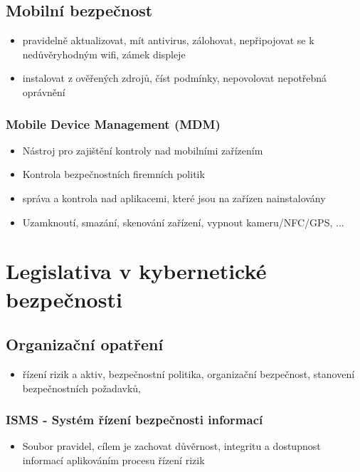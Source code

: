 \documentclass[10pt,a4paper]{article}
\begin{document}
\subsection{Mobilní bezpečnost}
\begin{itemize}
    \item pravidelně aktualizovat, mít antivirus, zálohovat, nepřipojovat se k nedůvěryhodným wifi, zámek displeje
    \item instalovat z ověřených zdrojů, číst podmínky, nepovolovat nepotřebná oprávnění
\end{itemize}

\subsubsection*{Mobile Device Management (MDM)}
\begin{itemize}
    \item Nástroj pro zajištění kontroly nad mobilními zařízením
    \item Kontrola bezpečnostních firemních politik
    \item správa a kontrola nad aplikacemi, které jsou na zařízen nainstalovány
    \item Uzamknoutí, smazání, skenování zařízení, vypnout kameru/NFC/GPS, ...
\end{itemize}



\section{Legislativa v kybernetické bezpečnosti}

\subsection{Organizační opatření}
\begin{itemize}
    \item řízení rizik a aktiv, bezpečnostní politika, organizační bezpečnost, stanovení bezpečnostních požadavků, 
\end{itemize}

\subsubsection*{ISMS - Systém řízení bezpečnosti informací}
\begin{itemize}
    \item Soubor pravidel, cílem je zachovat důvěrnost, integritu a dostupnost informací aplikováním procesu řízení rizik
\end{itemize}
\end{document}
